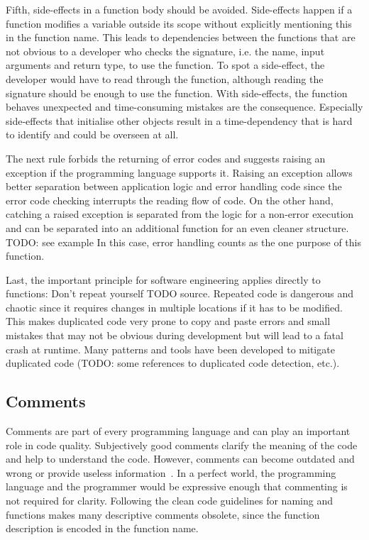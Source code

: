 Fifth, side-effects in a function body should be avoided. Side-effects happen if a function modifies a variable outside its scope without explicitly mentioning this in the function name. This leads to dependencies between the functions that are not obvious to a developer who checks the signature, i.e. the name, input arguments and return type, to use the function. To spot a side-effect, the developer would have to read through the function, although reading the signature should be enough to use the function. With side-effects, the function behaves unexpected and time-consuming mistakes are the consequence. Especially side-effects that initialise other objects result in a time-dependency that is hard to identify and could be overseen at all.

The next rule forbids the returning of error codes and suggests raising an exception if the programming language supports it. Raising an exception allows better separation between application logic and error handling code since the error code checking interrupts the reading flow of code. On the other hand, catching a raised exception is separated from the logic for a non-error execution and can be separated into an additional function for an even cleaner structure. TODO: see example In this case, error handling counts as the one purpose of this function.

Last, the important principle for software engineering applies directly to functions: Don't repeat yourself TODO source. Repeated code is dangerous and chaotic since it requires changes in multiple locations if it has to be modified. This makes duplicated code very prone to copy and paste errors and small mistakes that may not be obvious during development but will lead to a fatal crash at runtime. Many patterns and tools have been developed to mitigate duplicated code (TODO: some references to duplicated code detection, etc.).

\subsection{Comments}
Comments are part of every programming language and can play an important role in code quality. Subjectively good comments clarify the meaning of the code and help to understand the code. However, comments can become outdated and wrong or provide useless information~\cite{martin_clean_2009}. In a perfect world, the programming language and the programmer would be expressive enough that commenting is not required for clarity. Following the clean code guidelines for naming and functions makes many descriptive comments obsolete, since the function description is encoded in the function name.

